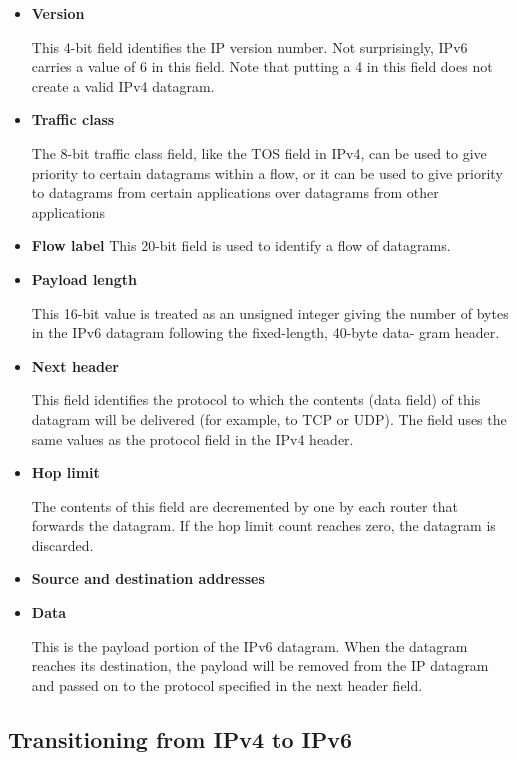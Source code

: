 \documentclass[11pt]{article}
\begin{document}
\begin{itemize}
	\item \textbf{Version}
	
	This 4-bit field identifies the IP version number. Not surprisingly, IPv6 carries a value of 6 in this field. Note that putting a 4 in this field does not create a valid IPv4 datagram.
	
	\item \textbf{Traffic class}
	
	The 8-bit traffic class field, like the TOS field in IPv4, can be used to give priority to certain datagrams within a flow, or it can be used to give priority to datagrams from certain applications over datagrams from other applications
	
	\item \textbf{Flow label} 
	This 20-bit field is used to identify a flow of datagrams.
	
	\item \textbf{Payload length}
	
	This 16-bit value is treated as an unsigned integer giving the number of bytes in the IPv6 datagram following the fixed-length, 40-byte data- gram header.
	
	\item \textbf{Next header}
	
	This field identifies the protocol to which the contents (data field) of this datagram will be delivered (for example, to TCP or UDP). The field uses the same values as the protocol field in the IPv4 header.
	
	\item \textbf{Hop limit}
	
	The contents of this field are decremented by one by each router that forwards the datagram. If the hop limit count reaches zero, the datagram is discarded.
	
	\item \textbf{Source and destination addresses}
	
	\item \textbf{Data} 
	
	This is the payload portion of the IPv6 datagram. When the datagram reaches its destination, the payload will be removed from the IP datagram and passed on to the protocol specified in the next header field.
	
\end{itemize}

\subsection{Transitioning from IPv4 to IPv6}
\end{document}
